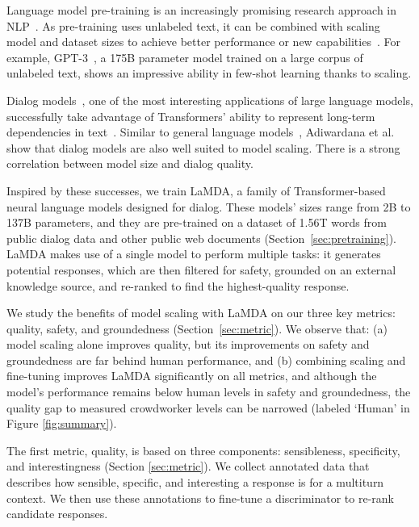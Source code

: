 \documentclass{article}
\begin{document}
Language model pre-training is an increasingly promising research approach in NLP~\cite{kiros2015skip,dai2015semi,peters-etal-2018-deep,howard2018universal,radford2018improving,devlin2018bert,yang2019xlnet,Lan2020ALBERT,liu2019roberta,Clark2020ELECTRA,t5,gpt320}. As pre-training uses unlabeled text, it can be combined with scaling model and dataset sizes to achieve better performance or new capabilities~\cite{Kaplan2020ScalingLF}. For example, GPT-3~\cite{gpt320}, a 175B parameter model trained on a large corpus of unlabeled text, shows an impressive ability in few-shot learning thanks to scaling.

Dialog models~\cite{shang-etal-2015-neural,sordoni2015neural,NCM}, one of the most interesting applications of large language models, successfully take advantage of Transformers' ability to represent long-term dependencies in text~\cite{adiwardana2020humanlike,blenderbot}. Similar to general language models~\cite{Kaplan2020ScalingLF}, Adiwardana et al.~\cite{adiwardana2020humanlike} show that dialog models are also well suited to model scaling. There is a strong correlation between model size and dialog quality.

Inspired by these successes, we train LaMDA, a family of Transformer-based neural language models designed for dialog. These models’ sizes range from 2B to 137B parameters, and they are pre-trained on a dataset of 1.56T words from public dialog data and other public web documents (Section~\ref{sec:pretraining}). LaMDA makes use of a single model to perform multiple tasks: it generates potential responses, which are then filtered for safety, grounded on an external knowledge source, and re-ranked to find the highest-quality response.

We study the benefits of model scaling with LaMDA on our three key metrics: quality, safety, and groundedness (Section~\ref{sec:metric}). We observe that: (a) model scaling alone improves quality, but its improvements on safety and groundedness are far behind human performance, and (b) combining scaling and fine-tuning improves LaMDA significantly on all metrics, and although the model’s performance remains below human levels in safety and groundedness, the quality gap to measured crowdworker levels can be narrowed (labeled `Human' in Figure \ref{fig:summary}).

The first metric, quality, is based on three components: sensibleness, specificity, and interestingness (Section \ref{sec:metric}). We collect annotated data that describes how sensible, specific, and interesting a response is for a multiturn context. We then use these annotations to fine-tune a discriminator to re-rank candidate responses.
\end{document}
